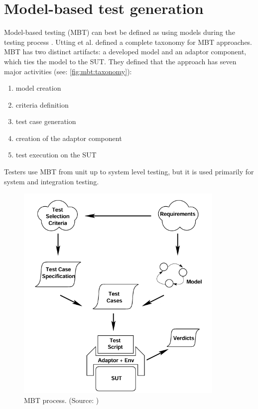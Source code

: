 \section{Model-based test generation}

Model-based testing (MBT) can best be defined as using models during the testing process \cite{cmbt:syllabus:2015}. Utting et al. \cite{utting2012taxonomy} defined a complete taxonomy for MBT approaches. MBT has two distinct artifacts: a developed model and an adaptor component, which ties the model to the SUT. They defined that the approach has seven major activities (see: \autoref{fig:mbt:taxonomy}):
\begin{enumerate}
    \item model creation
    \item criteria definition
    \item test case generation
    \item creation of the adaptor component
    \item test execution on the SUT
\end{enumerate}
Testers use MBT from unit up to system level testing, but it is used primarily for system and integration testing.

\begin{figure}
    \centering
    \includegraphics[width=100mm, keepaspectratio]{figures/mbt-taxonomy_uttinger.png}
    \caption{MBT process. (Source: \cite{utting2012taxonomy})}
    \label{fig:mbt:taxonomy}
\end{figure}

